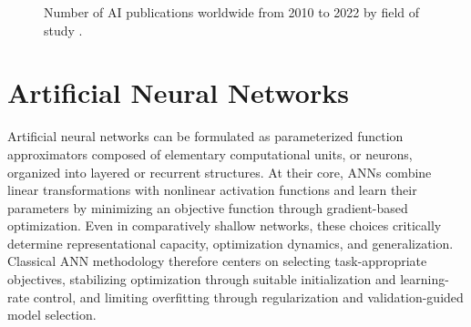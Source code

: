 \documentclass{article}
\newcounter{entry}[section]
\begin{document}
\begin{figure}[tbp]

    \caption{Number of AI publications worldwide from 2010 to 2022 by field of study \cite[p. 33]{maslej2024aiindex}.}
    \label{figure:AI_publications_by_field}
\end{figure}




\clearpage




\section{Artificial Neural Networks}

Artificial neural networks can be formulated as parameterized function approximators composed of elementary computational units, or neurons, organized into layered or recurrent structures. At their core, ANNs combine linear transformations with nonlinear activation functions and learn their parameters by minimizing an objective function through gradient-based optimization. Even in comparatively shallow networks, these choices critically determine representational capacity, optimization dynamics, and generalization. Classical ANN methodology therefore centers on selecting task-appropriate objectives, stabilizing optimization through suitable initialization and learning-rate control, and limiting overfitting through regularization and validation-guided model selection.
\end{document}

